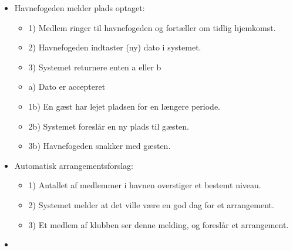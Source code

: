 \begin{itemize}
  \item Havnefogeden melder plads optaget:
  \begin{itemize}
    \item 1) Medlem ringer til havnefogeden og fortæller om tidlig hjemkomst.
    \item 2) Havnefogeden indtaster (ny) dato i systemet.
    \item 3) Systemet returnere enten a eller b
    \item a) Dato er accepteret
    \item 1b) En gæst har lejet pladsen for en længere periode.
    \item 2b) Systemet foreslår en ny plads til gæsten.
    \item 3b) Havnefogeden snakker med gæsten.
  \end{itemize}

  \item Automatisk arrangementsforslag:
  \begin{itemize}
    \item 1) Antallet af medlemmer i havnen overstiger et bestemt niveau.
    \item 2) Systemet melder at det ville være en god dag for et arrangement.
    \item 3) Et medlem af klubben ser denne melding, og foreslår et arrangement.
  \end{itemize}

  \item 


\end{itemize}

